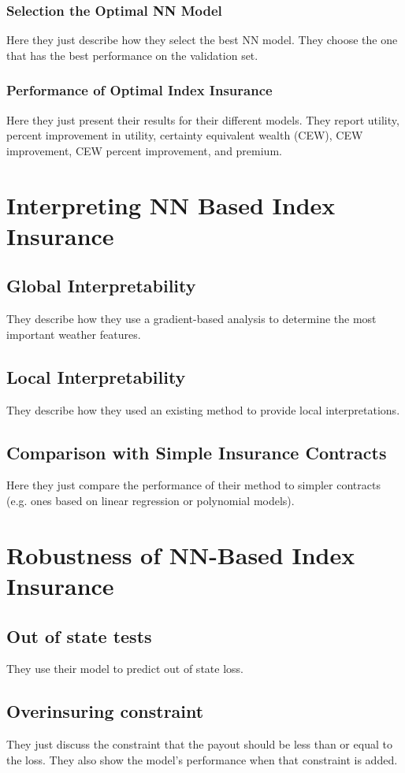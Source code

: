 \documentclass[11pt]{article}
\begin{document}
    \subsubsection{Selection the Optimal NN Model}
      Here they just describe how they select the best NN model. They choose the one that has the best performance on the validation set. 
    \subsubsection{Performance of Optimal Index Insurance}
      Here they just present their results for their different models. They report utility, percent improvement in utility, certainty equivalent wealth (CEW), CEW improvement, CEW percent improvement, and premium. 

\section{Interpreting NN Based Index Insurance}
  \subsection{Global Interpretability}
    They describe how they use a gradient-based analysis to determine the most important weather features. 
  \subsection{Local Interpretability}
    They describe how they used an existing method to provide local interpretations. 
  \subsection{Comparison with Simple Insurance Contracts}
    Here they just compare the performance of their method to simpler contracts (e.g. ones based on linear regression or polynomial models).

\section{Robustness of NN-Based Index Insurance}
  \subsection{Out of state tests}
    They use their model to predict out of state loss. 
  \subsection{Overinsuring constraint}
    They just discuss the constraint that the payout should be less than or equal to the loss. They also show the model's performance when that constraint is added. 
\end{document}

